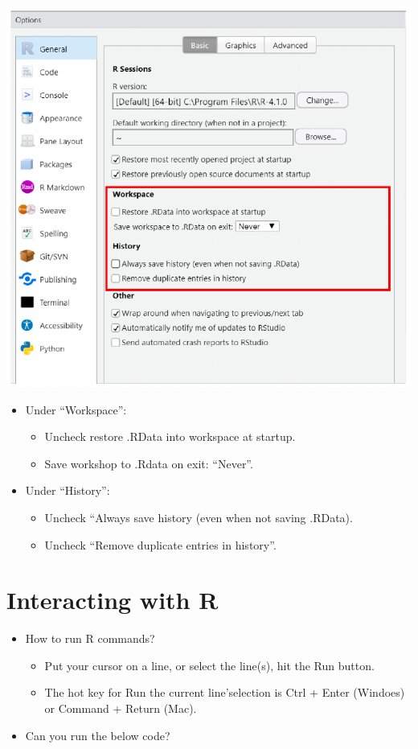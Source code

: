 \documentclass[
]{book}
\providecommand{\tightlist}{%
  \setlength{\itemsep}{0pt}\setlength{\parskip}{0pt}}
\begin{document}
\includegraphics{./img/useful_settings.png}

\begin{itemize}
\tightlist
\item
  Under ``Workspace'':

  \begin{itemize}
  \tightlist
  \item
    Uncheck restore .RData into workspace at startup.
  \item
    Save workshop to .Rdata on exit: ``Never''.
  \end{itemize}
\item
  Under ``History'':

  \begin{itemize}
  \tightlist
  \item
    Uncheck ``Always save history (even when not saving .RData).
  \item
    Uncheck ``Remove duplicate entries in history''.
  \end{itemize}
\end{itemize}

\section{Interacting with R}\label{interacting-with-r}

\begin{itemize}
\tightlist
\item
  How to run R commands?

  \begin{itemize}
  \tightlist
  \item
    Put your cursor on a line, or select the line(s), hit the Run button.
  \item
    The hot key for Run the current line'selection is Ctrl + Enter (Windoes) or Command + Return (Mac).
  \end{itemize}
\item
  Can you run the below code?
\end{itemize}
\end{document}
